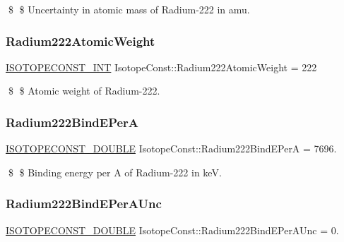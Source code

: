 \$ \$ Uncertainty in atomic mass of Radium-\/222 in amu. \mbox{\label{group___isotope_const-_radium-_ra222_ga100f69cb3d0a5e2e8f62061eef459a34}} 
\subsubsection{\texorpdfstring{Radium222\+Atomic\+Weight}{Radium222AtomicWeight}}
{\footnotesize\ttfamily \mbox{\hyperlink{group___isotope_const-_macros_ga5f18360b3e99483a35c32d789e62621c}{I\+S\+O\+T\+O\+P\+E\+C\+O\+N\+S\+T\+\_\+\+I\+NT}} Isotope\+Const\+::\+Radium222\+Atomic\+Weight = 222}

\$ \$ Atomic weight of Radium-\/222. \mbox{\label{group___isotope_const-_radium-_ra222_ga3c980a431be606e657dbc438cf0c9e09}} 
\subsubsection{\texorpdfstring{Radium222\+Bind\+E\+PerA}{Radium222BindEPerA}}
{\footnotesize\ttfamily \mbox{\hyperlink{group___isotope_const-_macros_ga8f45a7272ce02c0b4c65c44636ed719a}{I\+S\+O\+T\+O\+P\+E\+C\+O\+N\+S\+T\+\_\+\+D\+O\+U\+B\+LE}} Isotope\+Const\+::\+Radium222\+Bind\+E\+PerA = 7696.}

\$ \$ Binding energy per A of Radium-\/222 in keV. \mbox{\label{group___isotope_const-_radium-_ra222_ga266761185b38a80d3ffe4d9d298d2351}} 
\subsubsection{\texorpdfstring{Radium222\+Bind\+E\+Per\+A\+Unc}{Radium222BindEPerAUnc}}
{\footnotesize\ttfamily \mbox{\hyperlink{group___isotope_const-_macros_ga8f45a7272ce02c0b4c65c44636ed719a}{I\+S\+O\+T\+O\+P\+E\+C\+O\+N\+S\+T\+\_\+\+D\+O\+U\+B\+LE}} Isotope\+Const\+::\+Radium222\+Bind\+E\+Per\+A\+Unc = 0.}

